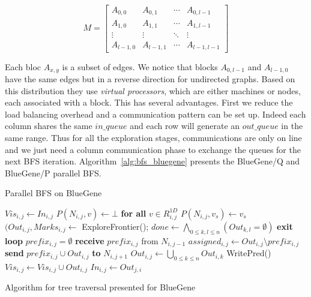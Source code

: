 \[ M = \left[ \begin{array}{cccc}
A_{0,0} & A_{0,1} & \cdots & A_{0,l-1} \\
A_{1,0} & A_{1,1} & \cdots & A_{1,l-1} \\
\vdots  & \vdots  & \ddots & \vdots    \\
A_{l-1,0} & A_{l-1,1}  & \cdots & A_{l-1,l-1} \end{array} \right] \] 

Each bloc $A_{x,y}$ is a subset of edges. 
We notice that blocks $A_{0,l-1}$ and $A_{l-1,0}$ have the same edges but in a reverse direction for undirected graphs. 
Based on this distribution they use \textit{virtual processors}, which are either machines or nodes, each associated with a block.
This has several advantages.
First we reduce the load balancing overhead and a communication pattern can be set up. 
Indeed each column shares the same $in\_queue$ and each row will generate an $out\_queue$ in the same range. 
Thus for all the exploration stages, communications are only on line and we just need a column communication phase to exchange the queues for the next BFS iteration.  
Algorithm~\ref{alg:bfs_bluegene} presents the BlueGene/Q and BlueGene/P parallel BFS.


\begin{algorithm}
\caption{Parallel BFS on BlueGene}\label{alg:bfs_bluegene}
\begin{algorithmic}[1]
\State $Vis_{i,j} \gets In_{i,j}$
\State $P(N_{i,j},v) \gets \bot$ \textbf{for all} $v \in R_{i,j}^{1D}$
\State $P(N_{i,j},v_s) \gets v_s$
\EndIf
{}
	\State$(Out_{i,j},Marks_{i,j} \gets $ ExploreFrontier();
	\State $done \gets \bigwedge\limits_{0 \leq k, l \leq n} (Out_{k,l} = \emptyset)$
		\State \textbf{exit loop}
	\EndIf
		\State $prefix_{i,j} = \emptyset$
	\Else 
		\State \textbf{receive} $prefix_{i,j}$ from $N_{i,j-1}$
	\EndIf
	\State $assigned_{i,j} \gets Out_{i,j} \setminus prefix_{i,j}$
		\State \textbf{send} $prefix_{i,j} \cup Out_{i,j}$ \textbf{to} $N_{i,j+1}$
	\EndIf
	\State $Out_{i,j} \gets \bigcup\limits_{0 \leq k \leq n} Out_{i,k}$
	\State WritePred()
	\State $Vis_{i,j} \gets Vis_{i,j} \cup Out_{i,j}$
	\State $In_{i,j} \gets Out_{j,i}$
\EndWhile
\end{algorithmic}
\caption{Algorithm for tree traversal presented for BlueGene}
\label{alg:bluegene}
\end{algorithm}

